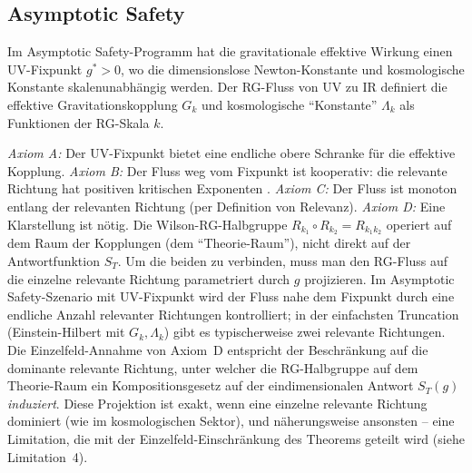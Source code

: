 \documentclass[aps,prd,twocolumn,superscriptaddress,nofootinbib]{revtex4-2}
\begin{document}
\subsection{Asymptotic Safety}

Im Asymptotic Safety-Programm \cite{Weinberg1979,Reuter1998,Percacci2017} hat die gravitationale effektive Wirkung einen UV-Fixpunkt $g^* > 0$, wo die dimensionslose Newton-Konstante und kosmologische Konstante skalenunabhängig werden. Der RG-Fluss von UV zu IR definiert die effektive Gravitationskopplung $G_k$ und kosmologische ``Konstante'' $\Lambda_k$ als Funktionen der RG-Skala $k$.

\textit{Axiom A:} Der UV-Fixpunkt bietet eine endliche obere Schranke für die effektive Kopplung. \textit{Axiom B:} Der Fluss weg vom Fixpunkt ist kooperativ: die relevante Richtung hat positiven kritischen Exponenten \cite{Percacci2017}. \textit{Axiom C:} Der Fluss ist monoton entlang der relevanten Richtung (per Definition von Relevanz). \textit{Axiom D:} Eine Klarstellung ist nötig. Die Wilson-RG-Halbgruppe $R_{k_1} \circ R_{k_2} = R_{k_1 k_2}$ operiert auf dem Raum der Kopplungen (dem ``Theorie-Raum''), nicht direkt auf der Antwortfunktion $S_T$. Um die beiden zu verbinden, muss man den RG-Fluss auf die einzelne relevante Richtung parametriert durch $g$ projizieren. Im Asymptotic Safety-Szenario mit UV-Fixpunkt wird der Fluss nahe dem Fixpunkt durch eine endliche Anzahl relevanter Richtungen kontrolliert; in der einfachsten Truncation (Einstein-Hilbert mit $G_k, \Lambda_k$) gibt es typischerweise zwei relevante Richtungen. Die Einzelfeld-Annahme von Axiom~D entspricht der Beschränkung auf die dominante relevante Richtung, unter welcher die RG-Halbgruppe auf dem Theorie-Raum ein Kompositionsgesetz auf der eindimensionalen Antwort $S_T(g)$ \textit{induziert}. Diese Projektion ist exakt, wenn eine einzelne relevante Richtung dominiert (wie im kosmologischen Sektor), und näherungsweise ansonsten -- eine Limitation, die mit der Einzelfeld-Einschränkung des Theorems geteilt wird (siehe Limitation~4).
\end{document}
